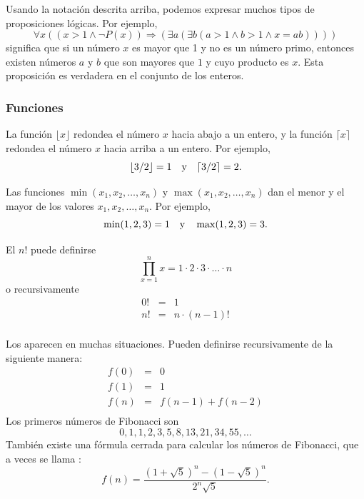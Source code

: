 Usando la notación descrita arriba,
podemos expresar muchos tipos de proposiciones lógicas.
Por ejemplo,
\[\forall x ((x>1 \land \lnot P(x)) \Rightarrow (\exists a (\exists b (a > 1 \land b > 1 \land x = ab))))\]
significa que si un número $x$ es mayor que 1
y no es un número primo,
entonces existen números $a$ y $b$
que son mayores que $1$ y cuyo producto es $x$.
Esta proposición es verdadera en el conjunto de los enteros.

\subsubsection{Funciones}

La función $\lfloor x \rfloor$ redondea el número $x$
hacia abajo a un entero, y la función
$\lceil x \rceil$ redondea el número $x$
hacia arriba a un entero. Por ejemplo,
\[ \lfloor 3/2 \rfloor = 1 \hspace{10px} \textrm{y} \hspace{10px} \lceil 3/2 \rceil = 2.\]

Las funciones $\min(x_1,x_2,\ldots,x_n)$
y $\max(x_1,x_2,\ldots,x_n)$
dan el menor y el mayor de los valores
$x_1,x_2,\ldots,x_n$.
Por ejemplo,
\[ \min(1,2,3)=1 \hspace{10px} \textrm{y} \hspace{10px} \max(1,2,3)=3.\]


El  $n!$ puede definirse
\[\prod_{x=1}^n x = 1 \cdot 2 \cdot 3 \cdot \ldots \cdot n\]
o recursivamente
\[
\begin{array}{lcl}
0! & = & 1 \\
n! & = & n \cdot (n-1)! \\
\end{array}
\]


Los 
aparecen en muchas situaciones.
Pueden definirse recursivamente de la siguiente manera:
\[
\begin{array}{lcl}
f(0) & = & 0 \\
f(1) & = & 1 \\
f(n) & = & f(n-1)+f(n-2) \\
\end{array}
\]
Los primeros números de Fibonacci son
\[0, 1, 1, 2, 3, 5, 8, 13, 21, 34, 55, \ldots\]
También existe una fórmula cerrada
para calcular los números de Fibonacci, que a veces se llama
 :
\[f(n)=\frac{(1 + \sqrt{5})^n - (1-\sqrt{5})^n}{2^n \sqrt{5}}.\]

